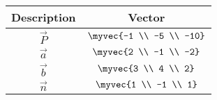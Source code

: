 \begin{tabular}{|c|c|}
\hline
\textbf{Description} & \textbf{Vector} \\
\hline
$\vec{P}$ & $\myvec{-1 \\ -5 \\ -10}$ \\
\hline
$\vec{a}$ & $\myvec{2 \\ -1 \\ -2}$ \\
\hline
$\vec{b}$ & $\myvec{3 \\ 4 \\ 2}$ \\
\hline
$\vec{n}$ & $\myvec{1 \\ -1 \\ 1}$ \\
\hline
\end{tabular}
